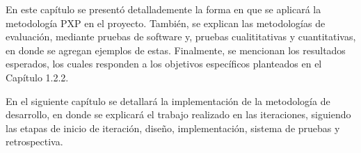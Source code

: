En este capítulo se presentó detallademente la forma en que se aplicará la metodología PXP en el proyecto. También, se explican las metodologías de evaluación, mediante pruebas de software y, pruebas cualititativas y cuantitativas, en donde se agregan ejemplos de estas. Finalmente, se mencionan los resultados esperados, los cuales responden a los objetivos específicos planteados en el Capítulo 1.2.2.

En el siguiente capítulo se detallará la implementación de la metodología de desarrollo, en donde se explicará el trabajo realizado en las iteraciones, siguiendo las etapas de inicio de iteración, diseño, implementación, sistema de pruebas y retrospectiva.
